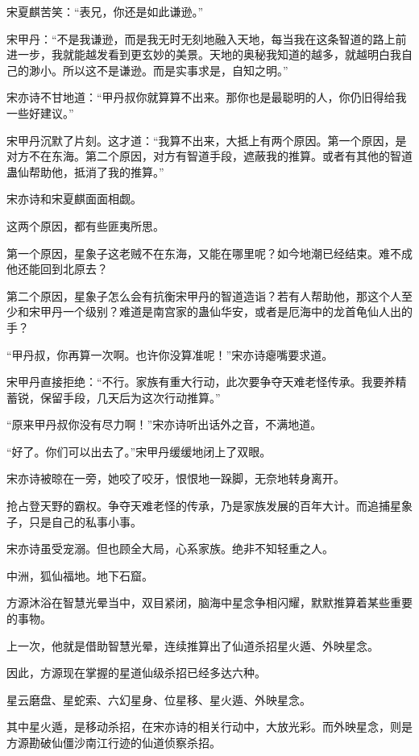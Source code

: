 \begin{this_body}
宋夏麒苦笑：“表兄，你还是如此谦逊。”

宋甲丹：“不是我谦逊，而是我无时无刻地融入天地，每当我在这条智道的路上前进一步，我就能越发看到更玄妙的美景。天地的奥秘我知道的越多，就越明白我自己的渺小。所以这不是谦逊。而是实事求是，自知之明。”

宋亦诗不甘地道：“甲丹叔你就算算不出来。那你也是最聪明的人，你仍旧得给我一些好建议。”

宋甲丹沉默了片刻。这才道：“我算不出来，大抵上有两个原因。第一个原因，是对方不在东海。第二个原因，对方有智道手段，遮蔽我的推算。或者有其他的智道蛊仙帮助他，抵消了我的推算。”

宋亦诗和宋夏麒面面相觑。

这两个原因，都有些匪夷所思。

第一个原因，星象子这老贼不在东海，又能在哪里呢？如今地潮已经结束。难不成他还能回到北原去？

第二个原因，星象子怎么会有抗衡宋甲丹的智道造诣？若有人帮助他，那这个人至少和宋甲丹一个级别？难道是南宫家的蛊仙华安，或者是厄海中的龙首龟仙人出的手？

“甲丹叔，你再算一次啊。也许你没算准呢！”宋亦诗瘪嘴要求道。

宋甲丹直接拒绝：“不行。家族有重大行动，此次要争夺天难老怪传承。我要养精蓄锐，保留手段，几天后为这次行动推算。”

“原来甲丹叔你没有尽力啊！”宋亦诗听出话外之音，不满地道。

“好了。你们可以出去了。”宋甲丹缓缓地闭上了双眼。

宋亦诗被晾在一旁，她咬了咬牙，恨恨地一跺脚，无奈地转身离开。

抢占登天野的霸权。争夺天难老怪的传承，乃是家族发展的百年大计。而追捕星象子，只是自己的私事小事。

宋亦诗虽受宠溺。但也顾全大局，心系家族。绝非不知轻重之人。

中洲，狐仙福地。地下石窟。

方源沐浴在智慧光晕当中，双目紧闭，脑海中星念争相闪耀，默默推算着某些重要的事物。

上一次，他就是借助智慧光晕，连续推算出了仙道杀招星火遁、外映星念。

因此，方源现在掌握的星道仙级杀招已经多达六种。

星云磨盘、星蛇索、六幻星身、位星移、星火遁、外映星念。

其中星火遁，是移动杀招，在宋亦诗的相关行动中，大放光彩。而外映星念，则是方源勘破仙僵沙南江行迹的仙道侦察杀招。


\end{this_body}
